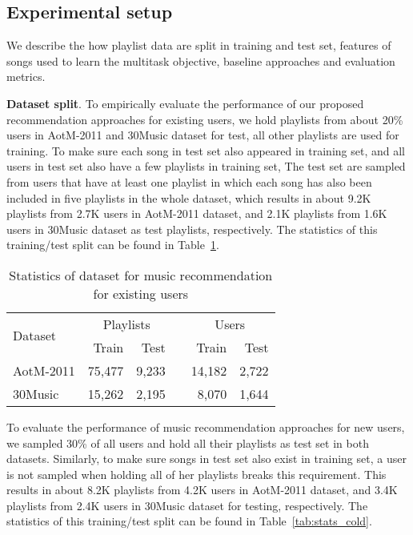 \subsection{Experimental setup}
We describe the how playlist data are split in training and test set,
features of songs used to learn the multitask objective, baseline approaches 
and evaluation metrics.

{\bf Dataset split}.
To empirically evaluate the performance of our proposed recommendation approaches for existing users,
we hold playlists from about 20\% users in AotM-2011 and 30Music dataset for test,
all other playlists are used for training.
To make sure each song in test set also appeared in training set, 
and all users in test set also have a few playlists in training set,
The test set are sampled from users that have at least one playlist in which each song has also been
included in five playlists in the whole dataset,
which results in about 9.2K playlists from 2.7K users in AotM-2011 dataset,
and 2.1K playlists from 1.6K users in 30Music dataset as test playlists, respectively.
The statistics of this training/test split can be found in Table~\ref{tab:stats_warm}.

\begin{table}[!h]
\centering
\caption{Statistics of dataset for music recommendation for existing users}
\label{tab:stats_warm}
\begin{tabular}{lrrcrr}
\toprule
\multirow{2}{*}{Dataset}  & \multicolumn{2}{c}{Playlists} && \multicolumn{2}{c}{Users} \\ \cmidrule{2-3} \cmidrule{5-6}
                          & Train & Test && Train & Test \\
\midrule
AotM-2011 & 75,477 & 9,233 && 14,182 & 2,722 \\
30Music   & 15,262 & 2,195 &&  8,070 & 1,644 \\
\bottomrule
\end{tabular}
\end{table}

To evaluate the performance of music recommendation approaches for new users,
we sampled 30\% of all users and hold all their playlists as test set in both datasets.
Similarly, to make sure songs in test set also exist in training set,
a user is not sampled when holding all of her playlists breaks this requirement.
This results in about 8.2K playlists from 4.2K users in AotM-2011 dataset,
and 3.4K playlists from 2.4K users in 30Music dataset for testing, respectively.
The statistics of this training/test split can be found in Table~\ref{tab:stats_cold}.

